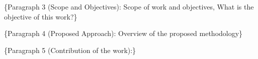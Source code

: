 \{Paragraph 3 (Scope and Objectives): Scope of work and objectives, What is the objective of this work?\}
        
    

\{Paragraph 4 (Proposed Approach): Overview of the proposed methodology\}

\{Paragraph 5 (Contribution of the work):\}

